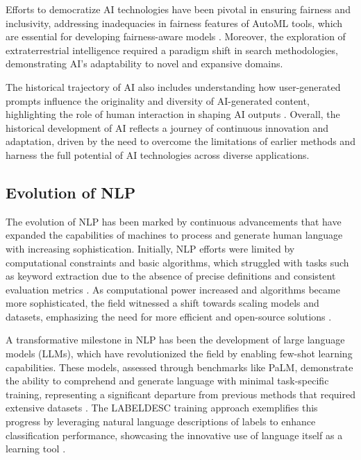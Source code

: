 Efforts to democratize AI technologies have been pivotal in ensuring fairness and inclusivity, addressing inadequacies in fairness features of AutoML tools, which are essential for developing fairness-aware models \cite{cieslinski2022axiomstypefreesubjectiveprobability}. Moreover, the exploration of extraterrestrial intelligence required a paradigm shift in search methodologies, demonstrating AI's adaptability to novel and expansive domains.



The historical trajectory of AI also includes understanding how user-generated prompts influence the originality and diversity of AI-generated content, highlighting the role of human interaction in shaping AI outputs \cite{palmini2024patternscreativityuserinput}. Overall, the historical development of AI reflects a journey of continuous innovation and adaptation, driven by the need to overcome the limitations of earlier methods and harness the full potential of AI technologies across diverse applications.



\subsection{Evolution of NLP} \label{subsec:Evolution of NLP}



The evolution of NLP has been marked by continuous advancements that have expanded the capabilities of machines to process and generate human language with increasing sophistication. Initially, NLP efforts were limited by computational constraints and basic algorithms, which struggled with tasks such as keyword extraction due to the absence of precise definitions and consistent evaluation metrics \cite{altuncu2022improvingperformanceautomatickeyword}. As computational power increased and algorithms became more sophisticated, the field witnessed a shift towards scaling models and datasets, emphasizing the need for more efficient and open-source solutions \cite{touvron2023llama}.



A transformative milestone in NLP has been the development of large language models (LLMs), which have revolutionized the field by enabling few-shot learning capabilities. These models, assessed through benchmarks like PaLM, demonstrate the ability to comprehend and generate language with minimal task-specific training, representing a significant departure from previous methods that required extensive datasets \cite{chowdhery2023palm}. The LABELDESC training approach exemplifies this progress by leveraging natural language descriptions of labels to enhance classification performance, showcasing the innovative use of language itself as a learning tool \cite{gao2023benefitslabeldescriptiontrainingzeroshot}.



